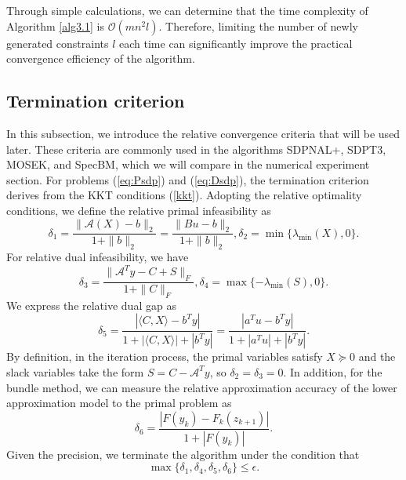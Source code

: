 \documentclass{jcmlatex}
\begin{document}
Through simple calculations, we can determine that the time complexity of Algorithm \ref{alg3.1} is \(\mathcal{O}(mn^{2}l)\). Therefore, limiting the number of newly generated constraints \(l\) each time can significantly improve the practical convergence efficiency of the algorithm.  
\subsection{Termination criterion}\label{subsec:Termination}
In this subsection, we introduce the relative convergence criteria that will be used later. These criteria are commonly used in the algorithms SDPNAL+\cite{yang2015sdpnal+}, SDPT3\cite{toh1999sdpt3}, MOSEK\cite{aps2019mosek}, and SpecBM\cite{ding2023revisiting}, which we will compare in the numerical experiment section. For problems (\ref{eq:Psdp}) and (\ref{eq:Dsdp}), the termination criterion derives from the KKT conditions (\ref{kkt}). Adopting the relative optimality conditions, we define the relative primal infeasibility as  
\begin{equation*}
\delta_{1}=\frac{\|\mathcal{A}(X)-b\|_{2}}{1+\|b\|_{2}}=\frac{\|Bu-b\|_{2}}{1+\|b\|_{2}},
\delta_{2}=\min\{\lambda_{\min}(X),0\}.
\end{equation*}  
For relative dual infeasibility, we have  
\begin{equation*}
\delta_{3}=\frac{\|\mathcal{A}^{T}y-C+S\|_{F}}{1+\|C\|_{F}},
\delta_{4}=\max\{-\lambda_{\min}(S),0\}.
\end{equation*}  
We express the relative dual gap as  
\begin{equation*}
\delta_{5}=\frac{|\langle C,X\rangle-b^{T}y|}{1+|\langle C,X\rangle|+|b^{T}y|}=\frac{|a^{T}u-b^{T}y|}{1+|a^{T}u|+|b^{T}y|}.
\end{equation*}  
By definition, in the iteration process, the primal variables satisfy \(X \succeq 0\) and the slack variables take the form \(S = C - \mathcal{A}^{T}y\), so \(\delta_{2} =\delta_{3} = 0\). In addition, for the bundle method, we can measure the relative approximation accuracy of the lower approximation model to the primal problem as  
\begin{equation*}
\delta_{6}=\frac{|F(y_{k})-F_{k}(z_{k+1})|}{1+|F(y_{k})|}.
\end{equation*}  
Given the precision, we terminate the algorithm under the condition that  
\begin{equation}\label{Termination}
\max\{\delta_{1},\delta_{4},\delta_{5},\delta_{6}\}\leq \epsilon.
\end{equation}
\end{document}
